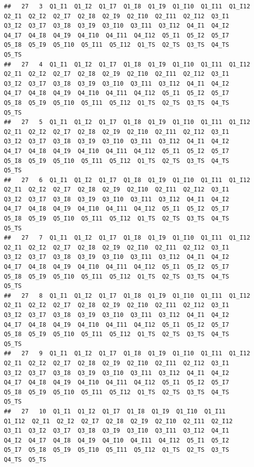 \documentclass[]{book}
\begin{document}
\begin{verbatim}
##   27   3  Q1_I1  Q1_I2  Q1_I7  Q1_I8  Q1_I9  Q1_I10  Q1_I11  Q1_I12  Q2_I1  Q2_I2  Q2_I7  Q2_I8  Q2_I9  Q2_I10  Q2_I11  Q2_I12  Q3_I1  Q3_I2  Q3_I7  Q3_I8  Q3_I9  Q3_I10  Q3_I11  Q3_I12  Q4_I1  Q4_I2  Q4_I7  Q4_I8  Q4_I9  Q4_I10  Q4_I11  Q4_I12  Q5_I1  Q5_I2  Q5_I7  Q5_I8  Q5_I9  Q5_I10  Q5_I11  Q5_I12  Q1_TS  Q2_TS  Q3_TS  Q4_TS  Q5_TS
##   27   4  Q1_I1  Q1_I2  Q1_I7  Q1_I8  Q1_I9  Q1_I10  Q1_I11  Q1_I12  Q2_I1  Q2_I2  Q2_I7  Q2_I8  Q2_I9  Q2_I10  Q2_I11  Q2_I12  Q3_I1  Q3_I2  Q3_I7  Q3_I8  Q3_I9  Q3_I10  Q3_I11  Q3_I12  Q4_I1  Q4_I2  Q4_I7  Q4_I8  Q4_I9  Q4_I10  Q4_I11  Q4_I12  Q5_I1  Q5_I2  Q5_I7  Q5_I8  Q5_I9  Q5_I10  Q5_I11  Q5_I12  Q1_TS  Q2_TS  Q3_TS  Q4_TS  Q5_TS
##   27   5  Q1_I1  Q1_I2  Q1_I7  Q1_I8  Q1_I9  Q1_I10  Q1_I11  Q1_I12  Q2_I1  Q2_I2  Q2_I7  Q2_I8  Q2_I9  Q2_I10  Q2_I11  Q2_I12  Q3_I1  Q3_I2  Q3_I7  Q3_I8  Q3_I9  Q3_I10  Q3_I11  Q3_I12  Q4_I1  Q4_I2  Q4_I7  Q4_I8  Q4_I9  Q4_I10  Q4_I11  Q4_I12  Q5_I1  Q5_I2  Q5_I7  Q5_I8  Q5_I9  Q5_I10  Q5_I11  Q5_I12  Q1_TS  Q2_TS  Q3_TS  Q4_TS  Q5_TS
##   27   6  Q1_I1  Q1_I2  Q1_I7  Q1_I8  Q1_I9  Q1_I10  Q1_I11  Q1_I12  Q2_I1  Q2_I2  Q2_I7  Q2_I8  Q2_I9  Q2_I10  Q2_I11  Q2_I12  Q3_I1  Q3_I2  Q3_I7  Q3_I8  Q3_I9  Q3_I10  Q3_I11  Q3_I12  Q4_I1  Q4_I2  Q4_I7  Q4_I8  Q4_I9  Q4_I10  Q4_I11  Q4_I12  Q5_I1  Q5_I2  Q5_I7  Q5_I8  Q5_I9  Q5_I10  Q5_I11  Q5_I12  Q1_TS  Q2_TS  Q3_TS  Q4_TS  Q5_TS
##   27   7  Q1_I1  Q1_I2  Q1_I7  Q1_I8  Q1_I9  Q1_I10  Q1_I11  Q1_I12  Q2_I1  Q2_I2  Q2_I7  Q2_I8  Q2_I9  Q2_I10  Q2_I11  Q2_I12  Q3_I1  Q3_I2  Q3_I7  Q3_I8  Q3_I9  Q3_I10  Q3_I11  Q3_I12  Q4_I1  Q4_I2  Q4_I7  Q4_I8  Q4_I9  Q4_I10  Q4_I11  Q4_I12  Q5_I1  Q5_I2  Q5_I7  Q5_I8  Q5_I9  Q5_I10  Q5_I11  Q5_I12  Q1_TS  Q2_TS  Q3_TS  Q4_TS  Q5_TS
##   27   8  Q1_I1  Q1_I2  Q1_I7  Q1_I8  Q1_I9  Q1_I10  Q1_I11  Q1_I12  Q2_I1  Q2_I2  Q2_I7  Q2_I8  Q2_I9  Q2_I10  Q2_I11  Q2_I12  Q3_I1  Q3_I2  Q3_I7  Q3_I8  Q3_I9  Q3_I10  Q3_I11  Q3_I12  Q4_I1  Q4_I2  Q4_I7  Q4_I8  Q4_I9  Q4_I10  Q4_I11  Q4_I12  Q5_I1  Q5_I2  Q5_I7  Q5_I8  Q5_I9  Q5_I10  Q5_I11  Q5_I12  Q1_TS  Q2_TS  Q3_TS  Q4_TS  Q5_TS
##   27   9  Q1_I1  Q1_I2  Q1_I7  Q1_I8  Q1_I9  Q1_I10  Q1_I11  Q1_I12  Q2_I1  Q2_I2  Q2_I7  Q2_I8  Q2_I9  Q2_I10  Q2_I11  Q2_I12  Q3_I1  Q3_I2  Q3_I7  Q3_I8  Q3_I9  Q3_I10  Q3_I11  Q3_I12  Q4_I1  Q4_I2  Q4_I7  Q4_I8  Q4_I9  Q4_I10  Q4_I11  Q4_I12  Q5_I1  Q5_I2  Q5_I7  Q5_I8  Q5_I9  Q5_I10  Q5_I11  Q5_I12  Q1_TS  Q2_TS  Q3_TS  Q4_TS  Q5_TS
##   27   10  Q1_I1  Q1_I2  Q1_I7  Q1_I8  Q1_I9  Q1_I10  Q1_I11  Q1_I12  Q2_I1  Q2_I2  Q2_I7  Q2_I8  Q2_I9  Q2_I10  Q2_I11  Q2_I12  Q3_I1  Q3_I2  Q3_I7  Q3_I8  Q3_I9  Q3_I10  Q3_I11  Q3_I12  Q4_I1  Q4_I2  Q4_I7  Q4_I8  Q4_I9  Q4_I10  Q4_I11  Q4_I12  Q5_I1  Q5_I2  Q5_I7  Q5_I8  Q5_I9  Q5_I10  Q5_I11  Q5_I12  Q1_TS  Q2_TS  Q3_TS  Q4_TS  Q5_TS

\end{verbatim}
\end{document}

